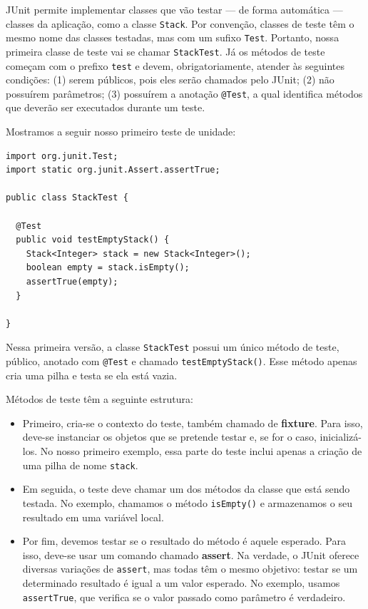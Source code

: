 \documentclass[
  11pt,
  twoside]{book}
\newcommand{\passthrough}[1]{#1}
\begin{document}
JUnit permite implementar classes que vão testar --- de forma automática
--- classes da aplicação, como a classe \passthrough{\lstinline!Stack!}.
Por convenção, classes de teste têm o mesmo nome das classes testadas,
mas com um sufixo \passthrough{\lstinline!Test!}. Portanto, nossa
primeira classe de teste vai se chamar
\passthrough{\lstinline!StackTest!}. Já os métodos de teste começam com
o prefixo \passthrough{\lstinline!test!} e devem, obrigatoriamente,
atender às seguintes condições: (1) serem públicos, pois eles serão
chamados pelo JUnit; (2) não possuírem parâmetros; (3) possuírem a
anotação \passthrough{\lstinline!@Test!}, a qual identifica métodos que
deverão ser executados durante um teste.

Mostramos a seguir nosso primeiro teste de unidade:

\begin{lstlisting}
import org.junit.Test;
import static org.junit.Assert.assertTrue;

public class StackTest {

  @Test
  public void testEmptyStack() {
    Stack<Integer> stack = new Stack<Integer>();
    boolean empty = stack.isEmpty();
    assertTrue(empty);
  }

}
\end{lstlisting}

Nessa primeira versão, a classe \passthrough{\lstinline!StackTest!}
possui um único método de teste, público, anotado com
\passthrough{\lstinline!@Test!} e chamado
\passthrough{\lstinline!testEmptyStack()!}. Esse método apenas cria uma
pilha e testa se ela está vazia.

Métodos de teste têm a seguinte estrutura:

\begin{itemize}
\item
  Primeiro, cria-se o contexto do teste, também chamado de
  \textbf{fixture}.  Para isso, deve-se
  instanciar os objetos que se pretende testar e, se for o caso,
  inicializá-los. No nosso primeiro exemplo, essa parte do teste inclui
  apenas a criação de uma pilha de nome \passthrough{\lstinline!stack!}.
\item
  Em seguida, o teste deve chamar um dos métodos da classe que está
  sendo testada. No exemplo, chamamos o método
  \passthrough{\lstinline!isEmpty()!} e armazenamos o seu resultado em
  uma variável local.
\item
  Por fim, devemos testar se o resultado do método é aquele esperado.
  Para isso, deve-se usar um comando chamado \textbf{assert}.
   Na verdade, o JUnit oferece diversas
  variações de \passthrough{\lstinline!assert!}, mas todas têm o mesmo
  objetivo: testar se um determinado resultado é igual a um valor
  esperado. No exemplo, usamos \passthrough{\lstinline!assertTrue!}, que
  verifica se o valor passado como parâmetro é verdadeiro.
\end{itemize}
\end{document}
